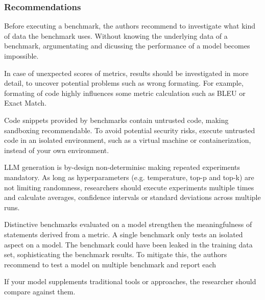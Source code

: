 \documentclass[11pt]{article}
\begin{document}
\subsubsection{Recommendations}

Before executing a benchmark, the authors recommend to investigate what kind of data the benchmark uses.
Without knowing the underlying data of a benchmark, argumentating and dicussing the performance of a model becomes impossible.

In case of unexpected scores of metrics, results should be investigated in more detail, to uncover potential problems such as wrong formating.
For example, formating of code highly influences some metric calculation such as BLEU or Exact Match.

Code snippets provided by benchmarks contain untrusted code, making sandboxing recommendable.
To avoid potential security risks, execute untrusted code in an isolated environment, such as a virtual machine or containerization, instead of your own environment.

LLM generation is by-design non-determinisc making repeated experiments mandatory. %
As long as hyperparameters (e.g. temperature, top-p and top-k) are not limiting randomness, researchers should execute experiments multiple times and calculate averages, confidence intervals or standard deviations across multiple runs.

Distinctive benchmarks evaluated on a model strengthen the meaningfulness of statements derived from a metric.
A single benchmark only tests an isolated aspect on a model.
The benchmark could have been leaked in the training data set, sophisticating the benchmark results.
To mitigate this, the authors recommend to test a model on multiple benchmark and report each

If your model supplements traditional tools or approaches, the researcher should compare against them.
\end{document}
